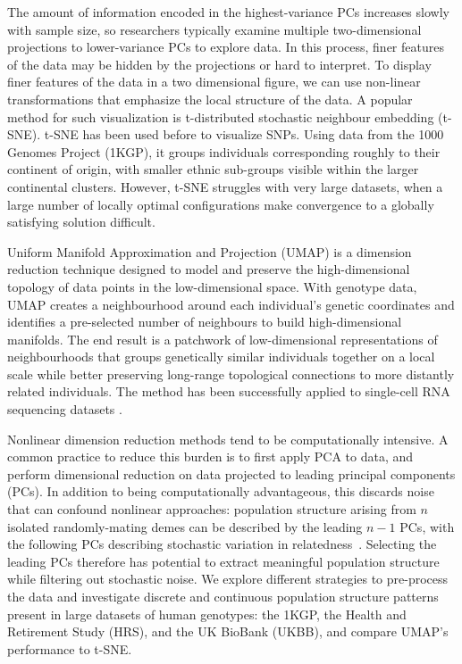 \documentclass[12pt]{pnas-new}
\begin{document}
The amount of information encoded in the highest-variance PCs increases slowly with sample size, so researchers typically examine multiple two-dimensional projections to lower-variance PCs to explore data. In this process, finer features of the data may be hidden by the projections or hard to interpret. To display finer features of the data in a two dimensional figure, we can use non-linear transformations that emphasize the local structure of the data. A popular method for such visualization is t-distributed stochastic neighbour embedding (t-SNE)\cite{maaten2008visualizing}. t-SNE has been used before to visualize SNPs\cite{platzer2013visualization}. Using data from the 1000 Genomes Project (1KGP)\cite{10002015global}, it groups individuals corresponding roughly to their continent of origin, with smaller ethnic sub-groups visible within the larger continental clusters\cite{li2017tsne}. However, t-SNE struggles with very large datasets, when a large number of locally optimal configurations make convergence to a globally satisfying solution difficult. 

Uniform Manifold Approximation and Projection (UMAP) is a dimension reduction technique designed to model and preserve the high-dimensional topology of data points in the low-dimensional space\cite{2018arXivUMAP}. With genotype data, UMAP creates a neighbourhood around each individual's genetic coordinates and identifies a pre-selected number of neighbours to build high-dimensional manifolds. The end result is a patchwork of low-dimensional representations of neighbourhoods that groups genetically similar individuals together on a local scale while better preserving long-range topological connections to more distantly related individuals. The method has been successfully applied to single-cell RNA sequencing datasets \cite{umap2018singlecell}.

Nonlinear dimension reduction methods tend to be computationally intensive. A common practice to reduce this burden is to first apply PCA to data, and perform dimensional reduction on data projected to leading principal components (PCs). In addition to being computationally advantageous, this discards noise that can confound nonlinear approaches: population structure arising from $n$ isolated randomly-mating demes can be described by the leading $n-1$ PCs, with the following PCs describing stochastic variation in relatedness~\cite{eigen2006}. Selecting the leading PCs therefore has potential to extract meaningful population structure while filtering out stochastic noise. We explore different strategies to pre-process the data and investigate discrete and continuous population structure patterns present in large datasets of human genotypes: the 1KGP, the Health and Retirement Study (HRS)\cite{juster1995overview}, and the UK BioBank (UKBB)\cite{sudlow2015uk}, and compare UMAP's performance to t-SNE.  
\end{document}
